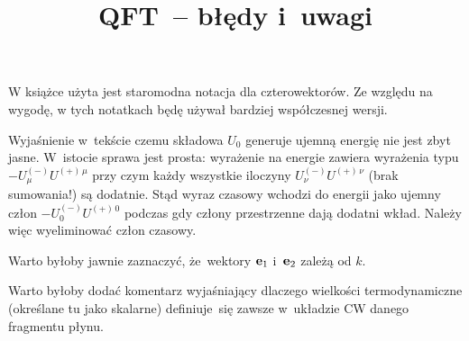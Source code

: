 \documentclass[a4paper,11pt]{article}
\title{QFT~-- błędy i~uwagi}
\begin{document}





\maketitle %









W książce użyta jest staromodna notacja dla czterowektorów. Ze względu
na wygodę, w tych notatkach będę używał bardziej współczesnej wersji.







 Wyjaśnienie w~tekście czemu składowa $U_{ 0 }$ generuje
ujemną energię nie jest zbyt jasne. W~istocie sprawa jest prosta:
wyrażenie na energie zawiera wyrażenia typu
$-U^{ ( - ) }_{ \mu } U^{ ( + )\, \mu }$ przy czym każdy wszystkie
iloczyny $U^{ ( - ) }_{ \nu } U^{ ( + )\, \nu }$ (brak sumowania!) są
dodatnie. Stąd wyraz czasowy wchodzi do energii jako ujemny człon
$-U^{ ( - ) }_{ 0 } U^{ ( + )\, 0 }$ podczas gdy człony przestrzenne
dają dodatni wkład. Należy więc wyeliminować człon czasowy.

\vspace{\spaceFour}



 Warto byłoby jawnie zaznaczyć, że~wektory $\mathbf{e}_{ 1 }$
i~$\mathbf{e}_{ 2 }$ zależą od $k$.

\vspace{\spaceFour}




\vspace{\spaceFour}



 Warto byłoby dodać komentarz wyjaśniający dlaczego wielkości
termodynamiczne (określane tu jako skalarne) definiuje~się zawsze
w~układzie CW danego fragmentu płynu.
\end{document}
